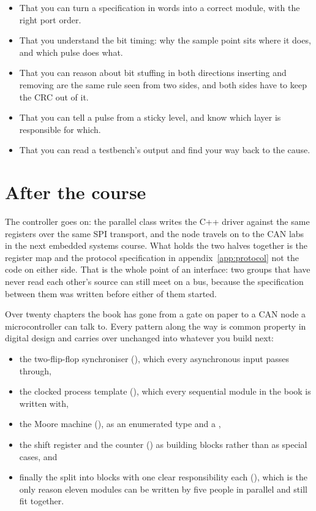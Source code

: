 \begin{itemize}
  \item That you can turn a specification in words into a correct module, with the right port order.
  \item That you understand the bit timing: why the sample point sits where it does, and which pulse
    does what.
  \item That you can reason about bit stuffing in both directions \textemdash{} inserting and removing
    are the same rule seen from two sides, and both sides have to keep the CRC out of it.
  \item That you can tell a pulse from a sticky level, and know which layer is responsible for which.
  \item That you can read a testbench's output and find your way back to the cause.
\end{itemize}

\section{After the course}
\label{c20:sec:after}

The controller goes on: the parallel class writes the C++ driver against the same registers over the
same SPI transport, and the node travels on to the CAN labs in the next embedded systems course. What
holds the two halves together is the register map and the protocol specification in
appendix~\ref{app:protocol} \textemdash{} not the code on either side. That is the whole point of an
interface: two groups that have never read each other's source can still meet on a bus, because the
specification between them was written before either of them started.

Over twenty chapters the book has gone from a gate on paper to a CAN node a microcontroller can talk
to. Every pattern along the way is common property in digital design and carries over unchanged into
whatever you build next:

\begin{itemize}
  \item the two-flip-flop synchroniser (), which every asynchronous input passes
    through,
  \item the clocked process template (), which every sequential module in the book is
    written with,
  \item the Moore machine (), as an enumerated type and a ,
  \item the shift register and the counter () as building blocks rather than as special
    cases, and
  \item finally the split into blocks with one clear responsibility each (), which is
    the only reason eleven modules can be written by five people in parallel and still fit together.
\end{itemize}

